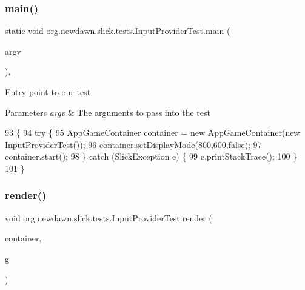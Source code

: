\subsubsection{\texorpdfstring{main()}{main()}}
{\footnotesize\ttfamily static void org.\+newdawn.\+slick.\+tests.\+Input\+Provider\+Test.\+main (\begin{DoxyParamCaption}\item[{String \mbox{[}$\,$\mbox{]}}]{argv }\end{DoxyParamCaption})\hspace{0.3cm}{\ttfamily [inline]}, {\ttfamily [static]}}

Entry point to our test


\begin{DoxyParams}{Parameters}
{\em argv} & The arguments to pass into the test \\
\hline
\end{DoxyParams}

\begin{DoxyCode}
93                                            \{
94         \textcolor{keywordflow}{try} \{
95             AppGameContainer container = \textcolor{keyword}{new} AppGameContainer(\textcolor{keyword}{new} 
      \mbox{\hyperlink{classorg_1_1newdawn_1_1slick_1_1tests_1_1_input_provider_test_ac6ab40655e43c6a108007f014f4ee12a}{InputProviderTest}}());
96             container.setDisplayMode(800,600,\textcolor{keyword}{false});
97             container.start();
98         \} \textcolor{keywordflow}{catch} (SlickException e) \{
99             e.printStackTrace();
100         \}
101     \}
\end{DoxyCode}
\mbox{\label{classorg_1_1newdawn_1_1slick_1_1tests_1_1_input_provider_test_a6b981fe1165f32a4c2d98179e693fc23}} 
\subsubsection{\texorpdfstring{render()}{render()}}
{\footnotesize\ttfamily void org.\+newdawn.\+slick.\+tests.\+Input\+Provider\+Test.\+render (\begin{DoxyParamCaption}\item[{\mbox{\hyperlink{classorg_1_1newdawn_1_1slick_1_1_game_container}{Game\+Container}}}]{container,  }\item[{\mbox{\hyperlink{classorg_1_1newdawn_1_1slick_1_1_graphics}{Graphics}}}]{g }\end{DoxyParamCaption})\hspace{0.3cm}{\ttfamily [inline]}}

